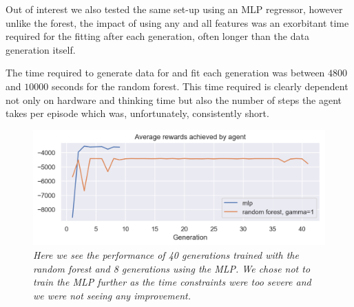 Out of interest we also tested the same set-up using an MLP regressor, however unlike the forest, the impact of using any and all features was an exorbitant time required for the fitting after each generation, often longer than the data generation itself.

The time required to generate data for and fit each generation was between $4800$ and $10000$ seconds for the random forest. This time required is clearly dependent not only on hardware and thinking time but also the number of steps the agent takes per episode which was, unfortunately, consistently short.

\begin{figure}[!h]
\centering
	\includegraphics[width=\linewidth]{images/mlp_vs_forest_gamma_1.png}
	\caption{\textit{Here we see the performance of 40 generations trained with the random forest and 8 generations using the MLP. We chose not to train the MLP further as the time constraints were too severe and we were not seeing any improvement.}}
	\label{mlp_vs_forest_gamma_1.0}
\end{figure}

